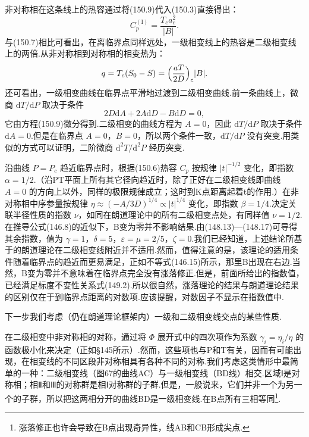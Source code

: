 非对称相在这条线上的热容通过将(150.9)代入(150.3)直接得出：
\begin{equation}
  C_p^{(\mathrm{I})}=\frac{T_ca_c^2}{|B|}.
\end{equation}
与(150.7)相比可看出，在离临界点同样远处，一级相变线上的热容是二级相变线上的两倍.从非对称相到对称相的相变热为：
\begin{equation}
  q=T_c(S_0-S)=\Bigl(\frac{aT}{2D}\Bigr)_c|B|.
\end{equation}
还可看出，一级相变曲线在临界点平滑地过渡到二级相变曲线.前一条曲线上，微商 $\mathrm{d}T/\mathrm{d}P$ 取决于条件
\begin{equation*}
  2D\mathrm{d}A+2A\mathrm{d}D-B\mathrm{d}D=0,
\end{equation*}
它由方程(150.9)微分得到.二级相变的曲线方程为 $A=0$，因此 $\mathrm{d}T/\mathrm{d}P$ 取决于条件 $\mathrm{d}A=0$.但是在临界点 $A=0$，$B=0$，所以两个条件一致，$\mathrm{d}T/\mathrm{d}P$ 没有突变.用类似的方式可以证明，二阶微商 $\mathrm{d}^2T/\mathrm{d}^2P$ 经历突变.

沿曲线 $P=P_c$ 趋近临界点时，根据(150.6)热容 $C_p$ 按规律 $|t|^{-1/2}$ 变化，即指数 $\alpha=1/2$.（沿PT平面上所有其它径向趋近时，除了正好在二级相变线即曲线 $A=0$ 的方向上以外，同样的极限规律成立；这时到K点距离起着t的作用.）在非对称相中序参量按规律 $\eta\approx(-A/3D)^{1/4}\propto|t|^{1/4}$ 变化，即指数 $\beta=1/4$.决定关联半径性质的指数 $\nu$，如同在朗道理论中的所有二级相变点处，有同样值 $\nu=1/2$.在推导公式(146.8)的近似下，B变为零并不影响结果.由(148.13)—(148.17)可导得其余指数，值为 $\gamma=1$，$\delta=5$，$\varepsilon=\mu=2/5$，$\zeta=0$.我们已经知道，上述结论所基于的朗道理论在二级相变线附近并不适用.然而，值得注意的是，该理论的适用条件随着临界点的趋近而更易满足，正如不等式(146.15)所示，那里B出现在右边.当然，B变为零并不意味着在临界点完全没有涨落修正.但是，前面所给出的指数值，已经满足标度不变性关系式(149.2).所以很自然，涨落理论的结果与朗道理论结果的区别仅在于到临界点距离的对数项.应该提醒，对数因子不显示在指数值中.

下一步我们考虑（仍在朗道理论框架内）一级和二级相变线交点的某些性质.

在二级相变中非对称相的对称，通过将 $\Phi$ 展开式中的四次项作为系数 $\gamma_i=\eta_i/\eta$ 的函数极小化来决定（正如§145所示）.然而，这些项也与P和T有关，因而有可能出现，在相变线的不同区段非对称相具有各种不同的对称.我们考虑这类情形中最简单的一种：二级相变线（图67的曲线AC）与一级相变线（BD线）相交.区域Ⅰ是对称相；相Ⅱ和Ⅲ的对称群是相Ⅰ对称群的子群.但是，一般说来，它们并非一个为另一个的子群，所以把这两相分开的曲线BD是一级相变线.在B点所有三相等同\footnote{涨落修正也许会导致在B点出现奇异性，线AB和CB形成尖点.}.

